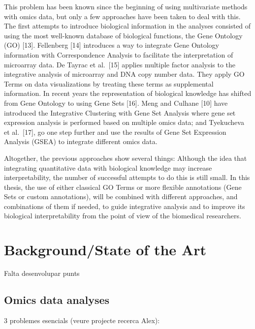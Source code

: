 \documentclass[a4paper, nobind]{templates/ociamthesis}
\begin{document}
This problem has been known since the beginning of using multivariate methods with omics data, but only a few approaches have been taken to deal with this. The first attempts to introduce biological information in the analyses consisted of using the most well-known database of biological functions, the Gene Ontology (GO) {[}13{]}. Fellenberg {[}14{]} introduces a way to integrate Gene Ontology information with Correspondence Analysis to facilitate the interpretation of microarray data. De Tayrac et al.~{[}15{]} applies multiple factor analysis to the integrative analysis of microarray and DNA copy number data. They apply GO Terms on data visualizations by treating these terms as supplemental information. In recent years the representation of biological knowledge has shifted from Gene Ontology to using Gene Sets {[}16{]}. Meng and Culhane {[}10{]} have introduced the Integrative Clustering with Gene Set Analysis where gene set expression analysis is performed based on multiple omics data; and Tyekucheva et al.~{[}17{]}, go one step further and use the results of Gene Set Expression Analysis (GSEA) to integrate different omics data.

Altogether, the previous approaches show several things: Although the idea that integrating quantitative data with biological knowledge may increase interpretability, the number of successful attempts to do this is still small. In this thesis, the use of either classical GO Terms or more flexible annotations (Gene Sets or custom annotations), will be combined with different approaches, and combinations of them if needed, to guide integrative analysis and to improve its biological interpretability from the point of view of the biomedical researchers.

\hypertarget{backgroundstate-of-the-art}{%
\section{Background/State of the Art}\label{backgroundstate-of-the-art}}

Falta desenvolupar punts

\hypertarget{omics-data-analyses}{%
\subsection{Omics data analyses}\label{omics-data-analyses}}

3 problemes esencials (veure projecte recerca Alex):
\end{document}
